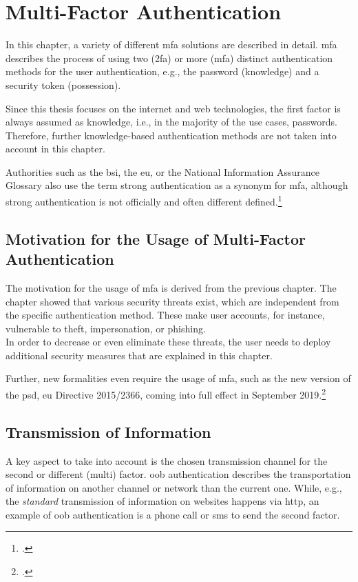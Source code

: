 \chapter{Multi-Factor Authentication}
\label{chap:mfa}

In this chapter, a variety of different \gls{mfa} solutions are described in detail. \Gls{mfa} describes the process of using two (\gls{2fa}) or more (\gls{mfa}) distinct authentication methods for the user authentication, e.g., the password (knowledge) and a security token (possession).

Since this thesis focuses on the internet and web technologies, the first factor is always assumed as knowledge, i.e., in the majority of the use cases, passwords. Therefore, further knowledge-based authentication methods are not taken into account in this chapter.

Authorities such as the \gls{bsi}, the \gls{eu}, or the National Information Assurance Glossary also use the term \frqq strong authentication\flqq{} as a synonym for \gls{mfa}, although strong authentication is not officially and often different defined.\footcites[See][47]{CNSS4009}[See][11]{deutschland2018grundschutz}

\section{Motivation for the Usage of Multi-Factor Authentication}

The motivation for the usage of \gls{mfa} is derived from the previous chapter. The chapter showed that various security threats exist, which are independent from the specific authentication method. These make user accounts, for instance, vulnerable to theft, impersonation, or phishing.\\
 In order to decrease or even eliminate these threats, the user needs to deploy additional security measures that are explained in this chapter.
 
 Further, new formalities even require the usage of \gls{mfa}, such as the new version of the \gls{psd}, \gls{eu} Directive 2015/2366, coming into full effect in September 2019.\footcites[See][10]{NOCTOR20189}

\newpage

\section{Transmission of Information}

A key aspect to take into account is the chosen transmission channel for the second or different (multi) factor. \gls{oob} authentication describes the transportation of information on another channel or network than the current one. While, e.g., the \textit{standard} transmission of information on websites happens via \gls{http}, an example of \gls{oob} authentication is a phone call or \gls{sms} to send the second factor.

